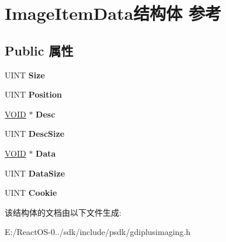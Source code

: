 \hypertarget{struct_image_item_data}{}\section{Image\+Item\+Data结构体 参考}
\label{struct_image_item_data}
\subsection*{Public 属性}
\begin{DoxyCompactItemize}
\item 
\mbox{\label{struct_image_item_data_a73d87019a7b645a8a4a95a93c56dda69}} 
U\+I\+NT {\bfseries Size}
\item 
\mbox{\label{struct_image_item_data_a413a62a9eff92727790c97679e38e0d1}} 
U\+I\+NT {\bfseries Position}
\item 
\mbox{\label{struct_image_item_data_a2134834404eeb92511eca1b6e9b2f6ea}} 
\hyperlink{interfacevoid}{V\+O\+ID} $\ast$ {\bfseries Desc}
\item 
\mbox{\label{struct_image_item_data_a5d94794d07ae8aa56fcb0b0648ddb32d}} 
U\+I\+NT {\bfseries Desc\+Size}
\item 
\mbox{\label{struct_image_item_data_abe2d9ab3bc07f7fc457fa4b04bca6ee6}} 
\hyperlink{interfacevoid}{V\+O\+ID} $\ast$ {\bfseries Data}
\item 
\mbox{\label{struct_image_item_data_aa7e06bed638777d61336ef8d1d683f65}} 
U\+I\+NT {\bfseries Data\+Size}
\item 
\mbox{\label{struct_image_item_data_a9ea9a35f3d00994a1df3e60797ae8103}} 
U\+I\+NT {\bfseries Cookie}
\end{DoxyCompactItemize}


该结构体的文档由以下文件生成\+:\begin{DoxyCompactItemize}
\item 
E\+:/\+React\+O\+S-\/0../sdk/include/psdk/gdiplusimaging.\+h\end{DoxyCompactItemize}

